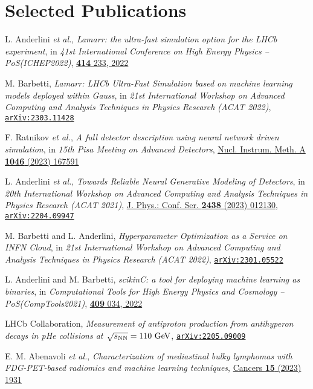 \newcommand{\arxiv}[1]
  {\href{https://arxiv.org/abs/#1}{\texttt{arXiv:#1}}}


\section*{Selected Publications}
\begin{cvcontent}
 \begin{enumerate}[label={[\arabic*]}, leftmargin=1cm]
    \item \label{pub:lamarr-ichep} L. Anderlini \emph{et al.},
    \emph{Lamarr: the ultra-fast simulation option for the LHCb experiment},
    in \emph{41st International Conference on High Energy Physics -- PoS(ICHEP2022)},
    \href{https://doi.org/10.22323/1.414.0233}{\textbf{414} 233, 2022}
    \item \label{pub:lamarr-acat} M. Barbetti,
    \emph{Lamarr: LHCb Ultra-Fast Simulation based on machine learning models deployed within Gauss},
    in \emph{21st International Workshop on Advanced Computing and Analysis Techniques in Physics Research (ACAT 2022)},
    \arxiv{2303.11428}
    \item \label{pub:gan-pm} F. Ratnikov \emph{et al.},
    \emph{A full detector description using neural network driven simulation},
    in \emph{15th Pisa Meeting on Advanced Detectors},
    \href{https://doi.org/10.1016/j.nima.2022.167591}{Nucl. Instrum. Meth. A \textbf{1046} (2023) 167591}
    \sloppy
    \item \label{pub:gan-acat} L. Anderlini \emph{et al.},
    \emph{Towards Reliable Neural Generative Modeling of Detectors},
    in \emph{20th International Workshop on Advanced Computing and Analysis Techniques in Physics Research (ACAT 2021)},
    \href{https://dx.doi.org/10.1088/1742-6596/2438/1/012130}{J. Phys.: Conf. Ser. \textbf{2438} (2023) 012130},
    \arxiv{2204.09947}
    \item \label{pub:hopaas} M. Barbetti and L. Anderlini,
    \emph{Hyperparameter Optimization as a Service on INFN Cloud},
    in \emph{21st International Workshop on Advanced Computing and Analysis Techniques in Physics Research (ACAT 2022)},
    \arxiv{2301.05522}
    \item \label{pub:scikinc} L. Anderlini and M. Barbetti, 
    \emph{scikinC: a tool for deploying machine learning as binaries}, 
    in \emph{Computational Tools for High Energy Physics and Cosmology -- PoS(CompTools2021)}, 
    \href{https://doi.org/10.22323/1.409.0034}{\textbf{409} 034, 2022}
    \item \label{pub:smog-pub} LHCb Collaboration,
    \emph{Measurement of antiproton production from antihyperon decays in pHe collisions at $\sqrt{s_{\rm{NN}}}=110~\rm{GeV}$},
    \arxiv{2205.09009}
    \item \label{pub:phys-med} E. M. Abenavoli \emph{et al.},
    \emph{Characterization of mediastinal bulky lymphomas with FDG-PET-based radiomics and machine learning techniques},
    \href{https://doi.org/10.3390/cancers15071931}{Cancers \textbf{15} (2023) 1931}
 \end{enumerate}
\end{cvcontent}